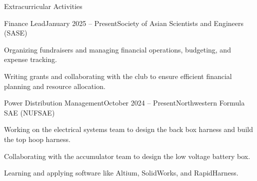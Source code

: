 \documentclass[
    a4paper,
    9pt,
]{resume}
\begin{document}
\begin{rSection}{Extracurricular Activities}
\begin{rSubsection}{Finance Lead}{January 2025 -- Present}{Society of Asian Scientists and Engineers (SASE)}{}
	\item Organizing fundraisers and managing financial operations, budgeting, and expense tracking.
    \item Writing grants and collaborating with the club to ensure efficient financial planning and resource allocation.
    \end{rSubsection}
    
    \begin{rSubsection}{Power Distribution Management}{October 2024 -- Present}{Northwestern Formula SAE (NUFSAE)}{}{}
    	\item Working on the electrical systems team to design the back box harness and build the top hoop harness.
    	\item Collaborating with the accumulator team to design the low voltage battery box.
        	\item Learning and applying software like Altium, SolidWorks, and RapidHarness.
    \end{rSubsection}






\end{rSection}
\end{document}
